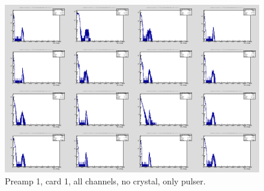 \documentclass{report}
\begin{document}
\begin{figure}[!htb]
  \includegraphics[width=\linewidth]{preamp1_lim_energy_card1_all.png}
  \caption{Preamp 1, card 1, all channels, no crystal, only pulser.}
\end{figure}
\end{document}
